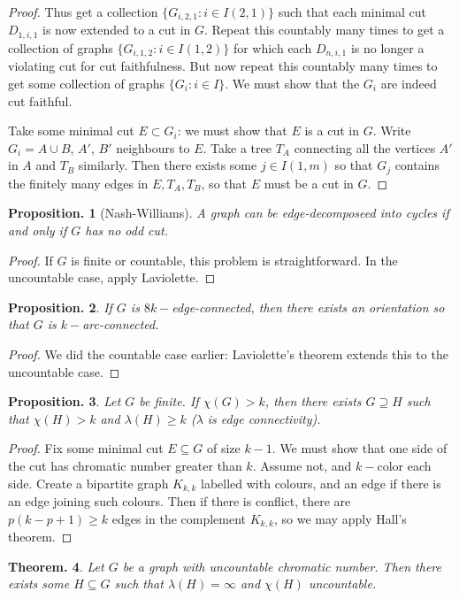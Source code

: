 \documentclass[11pt, a4paper]{memoir}
\theoremstyle{change}
\newtheorem{theorem}{Theorem.}[section]
\newtheorem{proposition}[theorem]{Proposition.}
\theoremstyle{plain}
\theoremstyle{nonumberplain}
\newtheorem{proof}{Proof}
\numberwithin{equation}{section}
\begin{document}
\begin{proof}
    Thus get a collection $\{G_{i,2,1}:i\in I(2,1)\}$ such that each minimal cut $D_{1,i,1}$ is now extended to a cut in $G$.
    Repeat this countably many times to get a collection of graphs $\{G_{i,1,2}:i\in I(1,2)\}$ for which each $D_{n,i,1}$ is no longer a violating cut for cut faithfulness.
    But now repeat this countably many times to get some collection of graphs $\{G_i:i\in I\}$.
    We must show that the $G_i$ are indeed cut faithful.

    Take some minimal cut $E\subset G_i$: we must show that $E$ is a cut in $G$.
    Write $G_i=A\cup B$, $A'$, $B'$ neighbours to $E$.
    Take a tree $T_A$ connecting all the vertices $A'$ in $A$ and $T_B$ similarly.
    Then there exists some $j\in I(1,m)$ so that $G_j$ contains the finitely many edges in $E,T_A,T_B$, so that $E$ must be a cut in $G$.
\end{proof}
\begin{proposition}[Nash-Williams]
    A graph can be edge-decomposeed into cycles if and only if $G$ has no odd cut.
\end{proposition}
\begin{proof}
    If $G$ is finite or countable, this problem is straightforward.
    In the uncountable case, apply Laviolette.
\end{proof}
\begin{proposition}
    If $G$ is $8k-$edge-connected, then there exists an orientation so that $G$ is $k-$arc-connected.
\end{proposition}
\begin{proof}
    We did the countable case earlier: Laviolette's theorem extends this to the uncountable case.
\end{proof}
\begin{proposition}
    Let $G$ be finite.
    If $\chi(G)>k$, then there exists $G\supseteq H$ such that $\chi(H)>k$ and $\lambda(H)\geq k$ ($\lambda$ is edge connectivity).
\end{proposition}
\begin{proof}
    Fix some minimal cut $E\subseteq G$ of size $k-1$.
    We must show that one side of the cut has chromatic number greater than $k$.
    Assume not, and $k-$color each side.
    Create a bipartite graph $K_{k,k}$ labelled with colours, and an edge if there is an edge joining such colours.
    Then if there is conflict, there are $p(k-p+1)\geq k$ edges in the complement $K_{k,k}$, so we may apply Hall's theorem.
\end{proof}
\begin{theorem}
    Let $G$ be a graph with uncountable chromatic number.
    Then there exists some $H\subseteq G$ such that $\lambda(H)=\infty$ and $\chi(H)$ uncountable.
\end{theorem}
\end{document}
